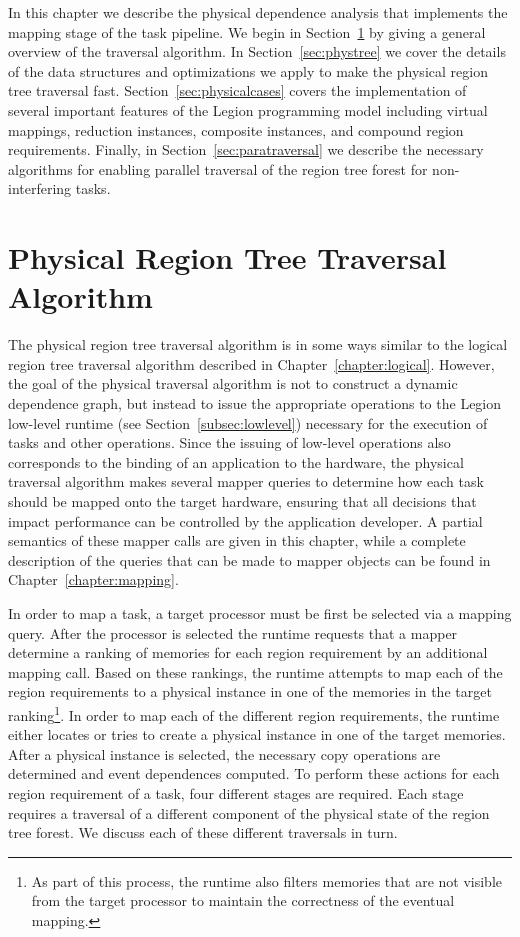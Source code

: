In this chapter we describe the physical 
dependence analysis that implements the
mapping stage of the task pipeline.  We begin
in Section~\ref{sec:phytraversal} by giving
a general overview of the traversal algorithm.
In Section~\ref{sec:phystree} we cover
the details of the data structures and 
optimizations we apply to make the physical
region tree traversal fast. 
Section~\ref{sec:physicalcases} covers
the implementation of several important
features of the Legion programming model
including virtual mappings, reduction
instances, composite instances, and compound 
region requirements. Finally, in 
Section~\ref{sec:paratraversal} we describe 
the necessary algorithms for enabling 
parallel traversal of the region
tree forest for non-interfering tasks.

\section{Physical Region Tree Traversal Algorithm}
\label{sec:phytraversal}
The physical region tree traversal algorithm is
in some ways similar to the logical region tree
traversal algorithm described in 
Chapter~\ref{chapter:logical}.  However, the 
goal of the physical traversal algorithm is not
to construct a dynamic dependence graph, but instead
to issue the appropriate operations to the 
Legion low-level runtime (see 
Section~\ref{subsec:lowlevel}) necessary for the
execution of tasks and other operations. 
Since the issuing of low-level operations
also corresponds to the binding of an application
to the hardware, the physical traversal algorithm
makes several mapper queries to determine
how each task should be mapped onto the target
hardware, ensuring that all decisions that
impact performance can be controlled by the
application developer. A partial semantics of
these mapper calls are given in this chapter,
while a complete description of the queries that
can be made to mapper objects can be found in
Chapter~\ref{chapter:mapping}.

In order to map a task, a target processor must
be first be selected via a mapping query. After
the processor is selected the runtime requests
that a mapper determine a ranking of memories
for each region requirement by an additional
mapping call. Based on these rankings, the runtime
attempts to map each of the region requirements
to a physical instance in one of the memories
in the target ranking\footnote{As part of this
process, the runtime also filters memories that 
are not visible from the target processor to 
maintain the correctness of the eventual mapping.}.
In order to map each of the different region
requirements, the runtime either locates or 
tries to create a physical instance in one of
the target memories. After a physical instance
is selected, the necessary copy operations are
determined and event dependences computed. To
perform these actions for each region requirement
of a task, four different stages are required. Each 
stage requires a traversal of a different
component of the physical state of the region
tree forest. We discuss each of these different 
traversals in turn.

